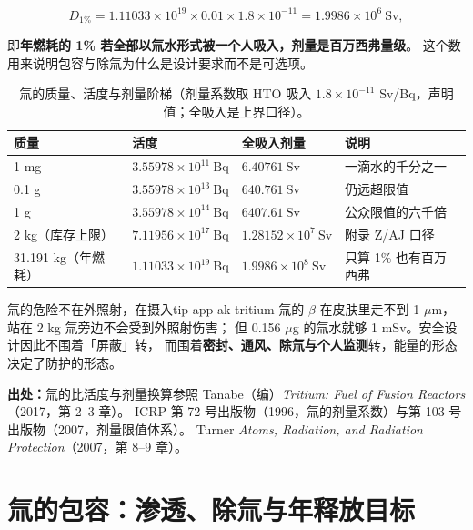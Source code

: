\begin{equation}
D_{1\%}=1.11033\times10^{19}\times0.01\times1.8\times10^{-11}
=1.9986\times10^{6}\ \mathrm{Sv},
\label{eq:app-ak-burn}
\end{equation}

即\textbf{年燃耗的 1\% 若全部以氚水形式被一个人吸入，剂量是百万西弗量级}。
这个数用来说明包容与除氚为什么是设计要求而不是可选项。

\begin{table}[htbp]
\centering
\small
\caption{氚的质量、活度与剂量阶梯（剂量系数取 HTO 吸入 $1.8\times10^{-11}$ Sv/Bq，声明值；全吸入是上界口径）。}
\label{tab:app-ak-tritium}
\begin{tabular}{p{2.7cm}p{3.6cm}p{3.1cm}p{4.3cm}}
\toprule
质量 & 活度 & 全吸入剂量 & 说明 \\
\midrule
1 mg & $3.55978\times10^{11}\ \mathrm{Bq}$ & $6.40761\ \mathrm{Sv}$ & 一滴水的千分之一 \\
0.1 g & $3.55978\times10^{13}\ \mathrm{Bq}$ & $640.761\ \mathrm{Sv}$ & 仍远超限值 \\
1 g & $3.55978\times10^{14}\ \mathrm{Bq}$ & $6407.61\ \mathrm{Sv}$ & 公众限值的六千倍 \\
2 kg（库存上限） & $7.11956\times10^{17}\ \mathrm{Bq}$ & $1.28152\times10^{7}\ \mathrm{Sv}$ & 附录 Z/AJ 口径 \\
31.191 kg（年燃耗） & $1.11033\times10^{19}\ \mathrm{Bq}$ & $1.9986\times10^{8}\ \mathrm{Sv}$ & 只算 1\% 也有百万西弗 \\
\bottomrule
\end{tabular}

\end{table}

\begin{tip}{氚的危险不在外照射，在摄入}{tip-app-ak-tritium}
氚的 $\beta$ 在皮肤里走不到 1 $\mu$m，站在 2 kg 氚旁边不会受到外照射伤害；
但 0.156 $\mu$g 的氚水就够 1 mSv。安全设计因此不围着「屏蔽」转，
而围着\textbf{密封、通风、除氚与个人监测}转，能量的形态决定了防护的形态。
\end{tip}

{\footnotesize
\textbf{出处：}氚的比活度与剂量换算参照 Tanabe（编）\emph{Tritium: Fuel of Fusion Reactors}（2017，第 2--3 章）。
ICRP 第 72 号出版物（1996，氚的剂量系数）与第 103 号出版物（2007，剂量限值体系）。
Turner \emph{Atoms, Radiation, and Radiation Protection}（2007，第 8--9 章）。
}

\section{氚的包容：渗透、除氚与年释放目标}
\label{sec:app-ak-containment}

